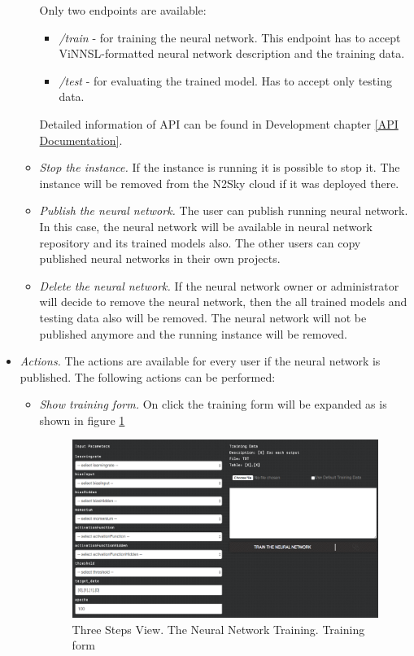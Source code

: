 \begin{itemize}
\begin{itemize}
Only two endpoints are available:
\begin{itemize}
\item \emph{/train} - for training the neural network. This endpoint has to accept ViNNSL-formatted neural network description and the training data. 
\item \emph{/test} - for evaluating the trained model. Has to accept only testing data.
\end{itemize}
Detailed information of API can be found in Development chapter \autoref{API Documentation}.
\item \emph{Stop the instance.} If the instance is running it is possible to stop it. The instance will be removed from the N2Sky cloud if it was deployed there.
\item \emph{Publish the neural network.} The user can publish running neural network. In this case, the neural network will be available in neural network repository and its trained models also. The other users can copy published neural networks in their own projects. 
\item \emph{Delete the neural network.} If the neural network owner or administrator will decide to remove the neural network, then the all trained models and testing data also will be removed. The neural network will not be published anymore and the running instance will be removed.
\end{itemize}
\item \emph{Actions.} The actions are available for every user if the neural network is published. The following actions can be performed:
\begin{itemize}
\item \emph{Show training form.} On click the training form will be expanded as is shown in figure \ref{fig:expand_training_form}

\begin{figure}[H]
\begin{center}
  \includegraphics[width=\linewidth]{components/5/img/expand_training_form.png}
  \caption{Three Steps View. The Neural Network Training. Training form}
  \label{fig:expand_training_form}
\end{center}
\end{figure}


\end{itemize}
\end{itemize}
